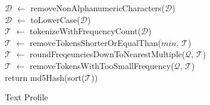\begin{wrapfigure}{H}{0.51\linewidth}
	\vspace*{-0.4cm}

\begin{scriptsize}
\begin{algorithm}[H]
		       

	$\mathcal{D}$ $\gets$ removeNonAlphanumericCharacters($\mathcal{D}$)\\
	$\mathcal{D}$ $\gets$ toLowerCase($\mathcal{D}$)\\
	$\mathcal{T}$ $\gets$ tokenizeWithFrequencyCount($\mathcal{D}$)\\
	$\mathcal{T}$ $\gets$ removeTokensShorterOrEqualThan($min$, $\mathcal{T}$)\\
	$\mathcal{T}$ $\gets$ roundFreqeunciesDownToNearestMultiple($\mathcal{Q}$, $\mathcal{T}$)\\
	$\mathcal{T}$ $\gets$ removeTokensWithTooSmallFrequency($\mathcal{Q}$, $\mathcal{T}$)\\

	return md5Hash(sort($\mathcal{T}$))\\
	\caption{Text Profile}
	\label{alg:text_profile}
\end{algorithm}
\end{scriptsize}

	\vspace*{-0.2cm}
\end{wrapfigure}
